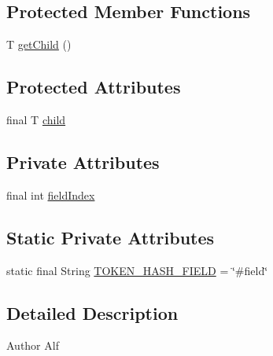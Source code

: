 \subsection*{Protected Member Functions}
\begin{DoxyCompactItemize}
\item 
T \hyperlink{classgov_1_1nasa_1_1jpf_1_1inspector_1_1server_1_1expression_1_1_expression_state_unary_operator_a150bac338d6557f79ca185d3f6ad6e06}{get\+Child} ()
\end{DoxyCompactItemize}
\subsection*{Protected Attributes}
\begin{DoxyCompactItemize}
\item 
final T \hyperlink{classgov_1_1nasa_1_1jpf_1_1inspector_1_1server_1_1expression_1_1_expression_state_unary_operator_a66041b1f569a361549e28a00f7ca5f2f}{child}
\end{DoxyCompactItemize}
\subsection*{Private Attributes}
\begin{DoxyCompactItemize}
\item 
final int \hyperlink{classgov_1_1nasa_1_1jpf_1_1inspector_1_1server_1_1expression_1_1expressions_1_1_expression_state_value_field_index_a73e1be57f920f5d0fd849d0d734ccf6a}{field\+Index}
\end{DoxyCompactItemize}
\subsection*{Static Private Attributes}
\begin{DoxyCompactItemize}
\item 
static final String \hyperlink{classgov_1_1nasa_1_1jpf_1_1inspector_1_1server_1_1expression_1_1expressions_1_1_expression_state_value_field_index_ac0077fdbca5fba23a15891d0c4703ca0}{T\+O\+K\+E\+N\+\_\+\+H\+A\+S\+H\+\_\+\+F\+I\+E\+LD} = \char`\"{}\#field\char`\"{}
\end{DoxyCompactItemize}


\subsection{Detailed Description}
\begin{DoxyAuthor}{Author}
Alf 
\end{DoxyAuthor}


